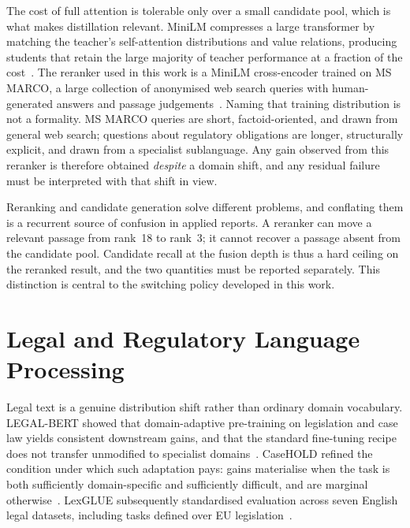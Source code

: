 The cost of full attention is tolerable only over a small candidate pool, which is what makes distillation relevant. MiniLM compresses a large transformer by matching the teacher's self-attention distributions and value relations, producing students that retain the large majority of teacher performance at a fraction of the cost~\cite{wang2020minilm}. The reranker used in this work is a MiniLM cross-encoder trained on MS MARCO, a large collection of anonymised web search queries with human-generated answers and passage judgements~\cite{nguyen2016msmarco}. Naming that training distribution is not a formality. MS MARCO queries are short, factoid-oriented, and drawn from general web search; questions about regulatory obligations are longer, structurally explicit, and drawn from a specialist sublanguage. Any gain observed from this reranker is therefore obtained \emph{despite} a domain shift, and any residual failure must be interpreted with that shift in view.

Reranking and candidate generation solve different problems, and conflating them is a recurrent source of confusion in applied reports. A reranker can move a relevant passage from rank~18 to rank~3; it cannot recover a passage absent from the candidate pool. Candidate recall at the fusion depth is thus a hard ceiling on the reranked result, and the two quantities must be reported separately. This distinction is central to the switching policy developed in this work.

\section{Legal and Regulatory Language Processing}
\label{sec:sota-legal}

Legal text is a genuine distribution shift rather than ordinary domain vocabulary. LEGAL-BERT showed that domain-adaptive pre-training on legislation and case law yields consistent downstream gains, and that the standard fine-tuning recipe does not transfer unmodified to specialist domains~\cite{chalkidis2020legalbert}. CaseHOLD refined the condition under which such adaptation pays: gains materialise when the task is both sufficiently domain-specific and sufficiently difficult, and are marginal otherwise~\cite{zheng2021casehold}. LexGLUE subsequently standardised evaluation across seven English legal datasets, including tasks defined over EU legislation~\cite{chalkidis2022lexglue}.

